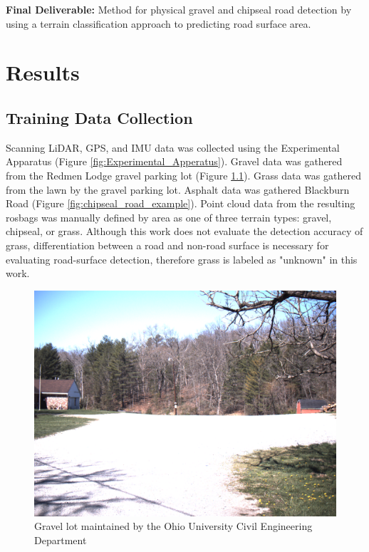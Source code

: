 \documentclass[numbered,pdftex]{ohio-etd}
\begin{document}
{{		{\textbf{Final Deliverable:} Method for physical gravel and chipseal road detection by using a terrain classification approach to predicting road surface area.}
		
	} %

\chapter{Results}{
	
	\section{Training Data Collection}\label{sec:training-data-collection}{
	
		{Scanning LiDAR, GPS, and IMU data was collected using the Experimental Apparatus (Figure \ref{fig:Experimental_Apperatus}). Gravel data was gathered from the Redmen Lodge gravel parking lot (Figure \ref{fig:gravel_lot_example}). Grass data was gathered from the lawn by the gravel parking lot. Asphalt data was gathered Blackburn Road (Figure \ref{fig:chipseal_road_example}). Point cloud data from the resulting rosbags was manually defined by area as one of three terrain types: gravel, chipseal, or grass. Although this work does not evaluate the detection accuracy of grass, differentiation between a road and non-road surface is necessary for evaluating road-surface detection, therefore grass is labeled as "unknown" in this work.}
		
		\begin{figure}[H]
			\centering
			\includegraphics[width=0.7\linewidth]{Defense_Images/gravel_lot_pic}
			\caption[Example of Gravel Road]{Gravel lot maintained by the Ohio University Civil Engineering Department}
			\label{fig:gravel_lot_example}
		\end{figure}
		
}}}
\end{document}
